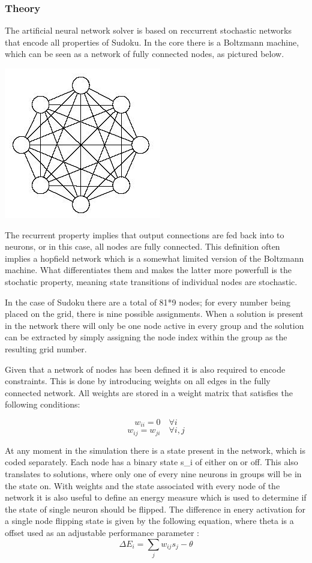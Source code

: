 \documentclass[a4paper,11pt]{kth-mag}
\begin{document}
\subsubsection{Theory}
The artificial neural network solver is based on reccurrent stochastic networks that encode all properties of Sudoku.
In the core there is a Boltzmann machine, which can be seen as a network of fully connected nodes, as pictured below.

\includegraphics{images/neural1.png}

The recurrent property implies that output connections are fed back into to neurons, or in this case, all nodes are fully connected.
This definition often implies a hopfield network which is a somewhat limited version of the Boltzmann machine.
What differentiates them and makes the latter more powerfull is the stochatic property, meaning state transitions of individual nodes are stochastic.

In the case of Sudoku there are a total of 81*9 nodes; for every number being placed on the grid, there is nine possible assignments.
When a solution is present in the network there will only be one node active in every group and the solution can be extracted by simply assigning the node index within the group as the resulting grid number.

Given that a network of nodes has been defined it is also required to encode constraints.
This is done by introducing weights on all edges in the fully connected network.
All weights are stored in a weight matrix that satisfies the following conditions:

\[
w_{ii} = 0 \quad \forall i
\]
\[
w_{ij} = w_{ji} \quad \forall i,j
\]

At any moment in the simulation there is a state present in the network, which is coded separately.
Each node has a binary state s\_i of either on or off.
This also translates to solutions, where only one of every nine neurons in groups will be in the state on.
With weights and the state associated with every node of the network it is also useful to define an energy measure which is used to determine if the state of single neuron should be flipped.
The difference in enery activation for a single node flipping state is given by the following equation, where theta is a offset used as an adjustable performance parameter \cite{boltzmann2}:
\[
\Delta E_{i} = \sum_{j} w_{ij} s_{j} - \theta
\]
\end{document}
